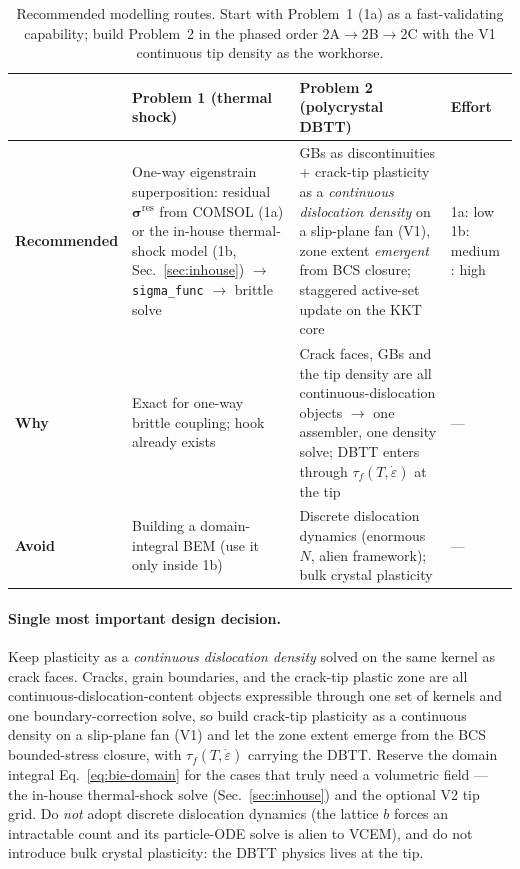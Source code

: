 \documentclass[11pt]{article}
\newcommand{\sig}{\bm{\sigma}}
\begin{document}
\begin{table}[h]
\centering
\small
\begin{tabular}{@{}p{2.3cm}p{4.7cm}p{4.7cm}p{2.5cm}@{}}
\toprule
 & \textbf{Problem 1 (thermal shock)} & \textbf{Problem 2 (polycrystal DBTT)} & \textbf{Effort} \\
\midrule
\textbf{Recommended} &
One-way eigenstrain superposition: residual $\sig^{\mathrm{res}}$ from COMSOL
(1a) or the in-house thermal-shock model (1b, Sec.~\ref{sec:inhouse})
$\to$ \texttt{sigma\_func} $\to$ brittle solve &
GBs as discontinuities + crack-tip plasticity as a \emph{continuous dislocation
density} on a slip-plane fan (V1), zone extent \emph{emergent} from BCS closure;
staggered active-set update on the KKT core & 1a: low \newline 1b: medium
\newline 2: high \\[2pt]
\textbf{Why} &
Exact for one-way brittle coupling; hook already exists &
Crack faces, GBs and the tip density are all continuous-dislocation objects $\to$
one assembler, one density solve; DBTT enters through $\tau_f(T,\dot\varepsilon)$
at the tip & --- \\[2pt]
\textbf{Avoid} &
Building a domain-integral BEM (use it only inside 1b) &
Discrete dislocation dynamics (enormous $N$, alien framework); bulk crystal
plasticity & --- \\
\bottomrule
\end{tabular}
\caption{Recommended modelling routes. Start with Problem~1 (1a) as a
fast-validating capability; build Problem~2 in the phased order
2A$\to$2B$\to$2C with the V1 continuous tip density as the workhorse.}
\end{table}

\paragraph{Single most important design decision.} Keep plasticity as a
\emph{continuous dislocation density} solved on the same kernel as crack faces.
Cracks, grain boundaries, and the crack-tip plastic zone are all
continuous-dislocation-content objects expressible through one set of kernels and
one boundary-correction solve, so build crack-tip plasticity as a continuous
density on a slip-plane fan (V1) and let the zone extent emerge from the
BCS bounded-stress closure, with $\tau_f(T,\dot\varepsilon)$ carrying the DBTT.
Reserve the domain integral Eq.~\eqref{eq:bie-domain} for the cases that truly
need a volumetric field --- the in-house thermal-shock solve
(Sec.~\ref{sec:inhouse}) and the optional V2 tip grid. Do \emph{not} adopt
discrete dislocation dynamics (the lattice $b$ forces an intractable count and
its particle-ODE solve is alien to VCEM), and do not introduce bulk crystal
plasticity: the DBTT physics lives at the tip.



\end{document}
